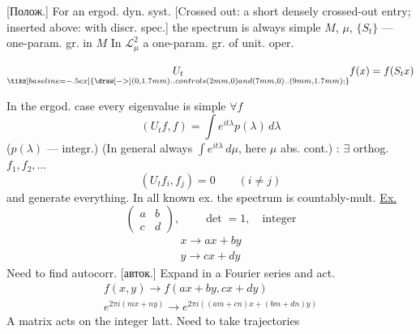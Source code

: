   [Полож.]
For an ergod. dyn. syst.
[Crossed out: a short densely crossed-out entry; inserted above: with discr. spec.]
the spectrum is always simple
$M$, $\mu$, $\{S_t\}$ --- one-param. gr. in $M$
In $\mathcal L^2_\mu$
a one-param. gr. of unit. oper.
\par\noindent\begin{minipage}{\linewidth}
\begin{equation*}
\underset{\tikz[baseline=-.5ex]{\draw[->] (0,1.7mm) .. controls (2mm,0) and (7mm,0) .. (9mm,1.7mm);}}{U_t}f(x)=f(S_t x)
\end{equation*}
\end{minipage}\par
In the ergod. case every eigenvalue is simple
$\forall f$
\begin{equation*}
(U_t f,f)=\int e^{it\lambda}p(\lambda)\,d\lambda
\end{equation*}
($p(\lambda)$ --- integr.)
(In general always $\int e^{it\lambda}\,d\mu$, here $\mu$ abs. cont.)
:
$\exists$ orthog. $f_1,f_2,\ldots$
\begin{equation*}
(U_t f_i,f_j)=0\qquad(i\neq j)
\end{equation*}
and generate everything.
In all known ex. the spectrum is countably-mult.
\underline{Ex.} 
\begin{equation*}
\begin{pmatrix}a&b\\c&d\end{pmatrix},
\qquad \det=1,\quad\text{integer}
\end{equation*}
\begin{gather*}
x\longrightarrow ax+by\\
y\longrightarrow cx+dy
\end{gather*}
Need to find autocorr. [авток.] Expand in a Fourier series and act.
\begin{gather*}
f(x,y)\longrightarrow f(ax+by,cx+dy)\\
e^{2\pi i(mx+ny)}
\longrightarrow e^{2\pi i((am+cn)x+(bm+dn)y)}
\end{gather*}
A matrix acts on the integer latt.
Need to take trajectories
